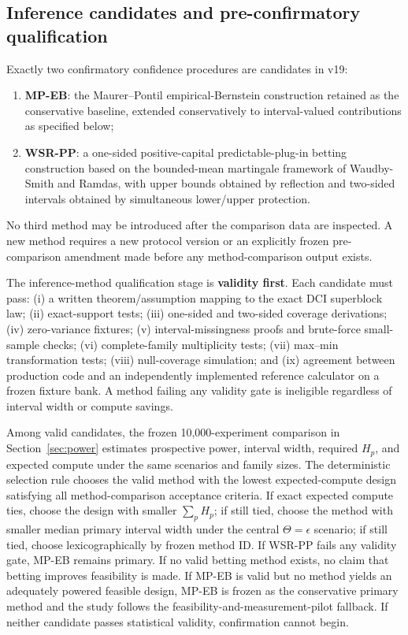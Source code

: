 \documentclass[11pt,a4paper]{article}
\begin{document}
\subsection{Inference candidates and pre-confirmatory qualification}
Exactly two confirmatory confidence procedures are candidates in v19:
\begin{enumerate}
\item \textbf{MP-EB}: the Maurer--Pontil empirical-Bernstein construction retained as the conservative baseline, extended conservatively to interval-valued contributions as specified below;
\item \textbf{WSR-PP}: a one-sided positive-capital predictable-plug-in betting construction based on the bounded-mean martingale framework of Waudby-Smith and Ramdas, with upper bounds obtained by reflection and two-sided intervals obtained by simultaneous lower/upper protection.
\end{enumerate}
No third method may be introduced after the comparison data are inspected. A new method requires a new protocol version or an explicitly frozen pre-comparison amendment made before any method-comparison output exists.

The inference-method qualification stage is \textbf{validity first}. Each candidate must pass: (i) a written theorem/assumption mapping to the exact DCI superblock law; (ii) exact-support tests; (iii) one-sided and two-sided coverage derivations; (iv) zero-variance fixtures; (v) interval-missingness proofs and brute-force small-sample checks; (vi) complete-family multiplicity tests; (vii) max--min transformation tests; (viii) null-coverage simulation; and (ix) agreement between production code and an independently implemented reference calculator on a frozen fixture bank. A method failing any validity gate is ineligible regardless of interval width or compute savings.

Among valid candidates, the frozen 10,000-experiment comparison in Section~\ref{sec:power} estimates prospective power, interval width, required $H_p$, and expected compute under the same scenarios and family sizes. The deterministic selection rule chooses the valid method with the lowest expected-compute design satisfying all method-comparison acceptance criteria. If exact expected compute ties, choose the design with smaller $\sum_pH_p$; if still tied, choose the method with smaller median primary interval width under the central $\Theta=\epsilon$ scenario; if still tied, choose lexicographically by frozen method ID. If WSR-PP fails any validity gate, MP-EB remains primary. If no valid betting method exists, no claim that betting improves feasibility is made. If MP-EB is valid but no method yields an adequately powered feasible design, MP-EB is frozen as the conservative primary method and the study follows the feasibility-and-measurement-pilot fallback. If neither candidate passes statistical validity, confirmation cannot begin.
\end{document}
